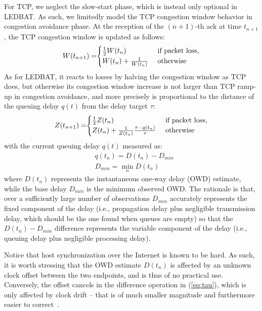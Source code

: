 \documentclass[conference]{IEEEtran}
\newcommand{\eqR}[1]{(\ref{eq:#1})}
\begin{document}
For TCP, we neglect the slow-start phase, which is instead only optional in LEDBAT. As such, we limitedly model the TCP congestion window behavior in congestion avoidance phase. At the reception of the $(n\!+\!1)$-th ack at time $t_{n+1}$, the TCP congestion window is updated as follows:
\begin{align}\label{eq:w}
W(t_{n+1})=\hspace{-1mm}
\begin{cases}
\frac{1}{2} W(t_n) &\text{ if packet loss,}\\
W(t_n)+ \frac{1}{W(t_n)}&\text{ otherwise}
\end{cases}
\end{align}
\noindent As for LEDBAT, it reacts to losses by halving the congestion window as TCP does, but otherwise its congestion window increase is not larger than TCP ramp-up in congestion avoidance, and more precisely is proportional to the distance of the queuing delay $q(t)$ from the delay target $\tau$:
\begin{align}\label{eq:z}
Z(t_{n+1})=\hspace{-1mm}
\begin{cases}
\frac{1}{2} Z(t_n) &\text{ if packet loss,}\\
Z(t_n) + \frac{1}{Z(t_n)}\frac{\tau-q(t_{n})}{\tau}&\text{ otherwise}
\end{cases}
\end{align}
\noindent with the current queuing delay $q(t)$ measured as:
\begin{align}\label{eq:tau}
   &	q(t_n) = D(t_n) - D_{min}\\
   &    D_{min} = \min_n D(t_n)
\end{align}
\noindent where $D(t_n)$ represents the instantaneous one-way delay (OWD) estimate, while the base delay $D_{min}$ is the minimum observed OWD. The rationale is that, over a sufficiently large number of observations $D_{min}$ accurately represents the fixed component of the delay (i.e., propagation delay plus negligible transmission delay, which should be the one found when queues are empty) so that the $D(t_n) - D_{min}$  difference represents the variable component of the delay (i.e., queuing delay plus negligible processing delay). 

Notice that host synchronization over the Internet is known to be hard. As such, it is worth stressing that the OWD estimate $D(t_n)$ is affected by an unknown clock offset between the two endpoints, and is thus of no practical use. Conversely, the offset cancels in the difference operation in \eqR{tau}, which is only affected by clock drift -- that is of much smaller magnitude and furthermore easier to correct~\cite{cohen10iptps}.
\end{document}
